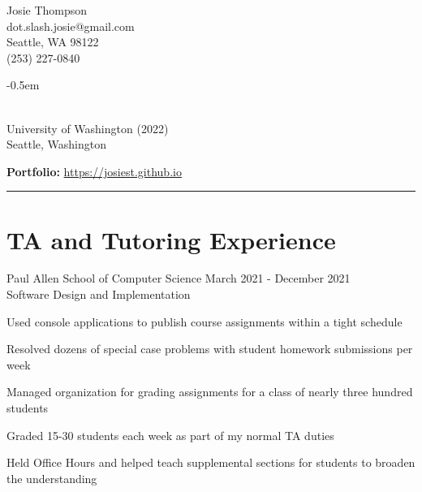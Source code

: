 \documentclass[10pt]{article}
\newenvironment{itemize*}
{\begin{itemize}[leftmargin=*]
    \setlength{\parskip}{0.5pt}}
{\end{itemize}}
\begin{document}
\begin{paracol}{2}
\noindent
\parbox[t]{0.5\textwidth}{
    {\sffamily\Huge Josie Thompson}\medskip\\
    dot.slash.josie@gmail.com \\
    Seattle, WA 98122\\
    (253) 227-0840
}
\switchcolumn

\begin{description}
\itemsep -0.5em
\item[B.S. in Computer Science] \hfill \\
    University of Washington (2022)\\
    Seattle, Washington
\end{description}

\textbf{Portfolio:} \url{https://josiest.github.io}
\end{paracol}
\vspace{12pt}
\hrule

\section*{TA and Tutoring Experience}
\begin{description}[leftmargin=!,
                    labelwidth=\widthof{\bfseries Teaching Assistant}]

\item[Teaching Assistant] Paul Allen School of Computer Science \hfill 
    March 2021 - December 2021\\
    Software Design and Implementation
\end{description}
\begin{itemize*}
\item Used console applications to publish course assignments within a tight schedule
\item Resolved dozens of special case problems with student homework submissions per week
\item Managed organization for grading assignments for a class of nearly three hundred students
\item Graded 15-30 students each week as part of my normal TA duties
\item Held Office Hours and helped teach supplemental sections for students to
    broaden the understanding
\end{itemize*}
\vspace{10pt}
\end{document}
